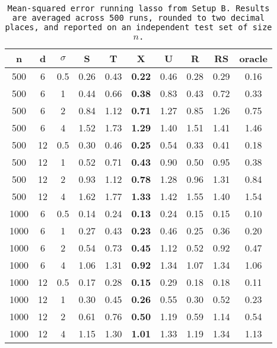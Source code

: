 \begin{table}[ht]
\centering
\begin{tabular}{cccccccccc}
  \hline
n & d & $\sigma$ & S & T & X & U & R & RS & oracle \\ 
  \hline
500 & 6 & 0.5 & 0.26 & 0.43 & \bf 0.22 & 0.46 & 0.28 & 0.29 & 0.16 \\ 
  500 & 6 & 1 & 0.44 & 0.66 & \bf 0.38 & 0.83 & 0.43 & 0.72 & 0.33 \\ 
  500 & 6 & 2 & 0.84 & 1.12 & \bf 0.71 & 1.27 & 0.85 & 1.26 & 0.75 \\ 
  500 & 6 & 4 & 1.52 & 1.73 & \bf 1.29 & 1.40 & 1.51 & 1.41 & 1.46 \\ 
  500 & 12 & 0.5 & 0.30 & 0.46 & \bf 0.25 & 0.54 & 0.33 & 0.41 & 0.18 \\ 
  500 & 12 & 1 & 0.52 & 0.71 & \bf 0.43 & 0.90 & 0.50 & 0.95 & 0.38 \\ 
  500 & 12 & 2 & 0.93 & 1.12 & \bf 0.78 & 1.28 & 0.96 & 1.31 & 0.84 \\ 
  500 & 12 & 4 & 1.62 & 1.77 & \bf 1.33 & 1.42 & 1.55 & 1.40 & 1.54 \\ 
  1000 & 6 & 0.5 & 0.14 & 0.24 & \bf 0.13 & 0.24 & 0.15 & 0.15 & 0.10 \\ 
  1000 & 6 & 1 & 0.27 & 0.43 & \bf 0.23 & 0.46 & 0.25 & 0.36 & 0.20 \\ 
  1000 & 6 & 2 & 0.54 & 0.73 & \bf 0.45 & 1.12 & 0.52 & 0.92 & 0.47 \\ 
  1000 & 6 & 4 & 1.06 & 1.31 & \bf 0.92 & 1.34 & 1.07 & 1.34 & 1.06 \\ 
  1000 & 12 & 0.5 & 0.17 & 0.28 & \bf 0.15 & 0.29 & 0.18 & 0.18 & 0.11 \\ 
  1000 & 12 & 1 & 0.30 & 0.45 & \bf 0.26 & 0.55 & 0.30 & 0.52 & 0.23 \\ 
  1000 & 12 & 2 & 0.61 & 0.76 & \bf 0.50 & 1.19 & 0.59 & 1.14 & 0.54 \\ 
  1000 & 12 & 4 & 1.15 & 1.30 & \bf 1.01 & 1.33 & 1.19 & 1.34 & 1.13 \\ 
   \hline
\end{tabular}
\caption{\tt Mean-squared error running \texttt{lasso} from Setup B. Results are averaged across 500 runs, rounded to two decimal places, and reported on an independent test set of size $n$.} 
\label{table:setup2}
\end{table}
